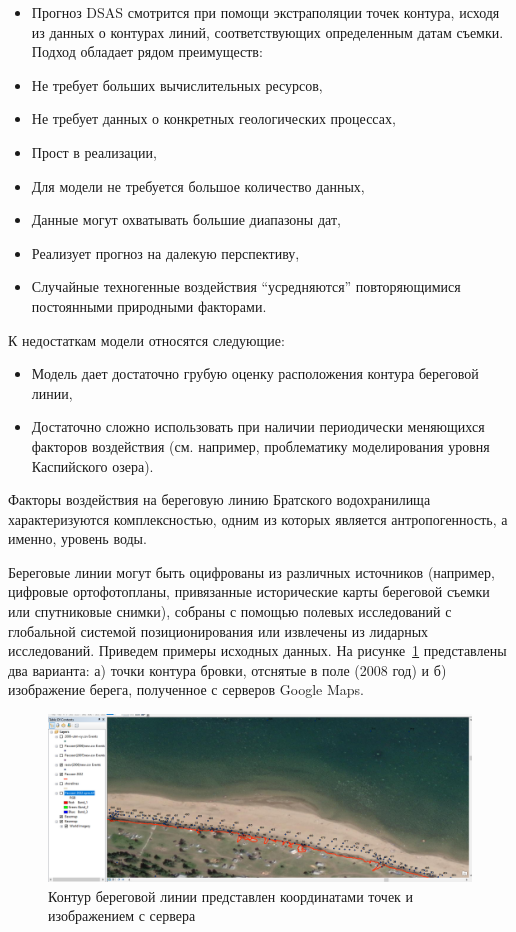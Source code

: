 \documentclass[732,fontsize=14pt,final]{studrep}
\begin{document}
\begin{itemize}
\item Прогноз DSAS смотрится при помощи экстраполяции точек контура, исходя из данных о контурах линий, соответствующих определенным датам съемки. Подход обладает рядом преимуществ:
\item   Не требует больших вычислительных ресурсов,
\item   Не требует данных о конкретных геологических процессах,
\item   Прост в реализации,
\item   Для модели не требуется большое количество данных,
\item   Данные могут охватывать большие диапазоны дат,
\item   Реализует прогноз на далекую перспективу,
\item   Случайные техногенные воздействия “усредняются” повторяющимися постоянными природными факторами.
\end{itemize}

К недостаткам модели относятся следующие:

\begin{itemize}
\item Модель дает достаточно грубую оценку расположения контура береговой линии,
\item Достаточно сложно использовать при наличии периодически меняющихся факторов воздействия (см. например, проблематику моделирования уровня Каспийского озера).
\end{itemize}
Факторы воздействия на береговую линию Братского водохранилища характеризуются комплексностью, одним из которых является антропогенность, а именно, уровень воды. 

Береговые линии могут быть оцифрованы из различных источников (например, цифровые ортофотопланы, привязанные исторические карты береговой съемки или спутниковые снимки), собраны с помощью полевых исследований с глобальной системой позиционирования или извлечены из лидарных исследований. Приведем примеры исходных данных. На рисунке~\ref{google-src} представлены два варианта: а) точки контура бровки, отснятые в поле (2008 год) и б) изображение берега, полученное с серверов Google Maps.

\begin{figure}[htp]
  \centering
  \includegraphics[width=\linewidth]{pics/image22.png}
  \caption{Контур береговой линии представлен координатами точек и изображением с сервера}\label{google-src}
\end{figure}
\end{document}
